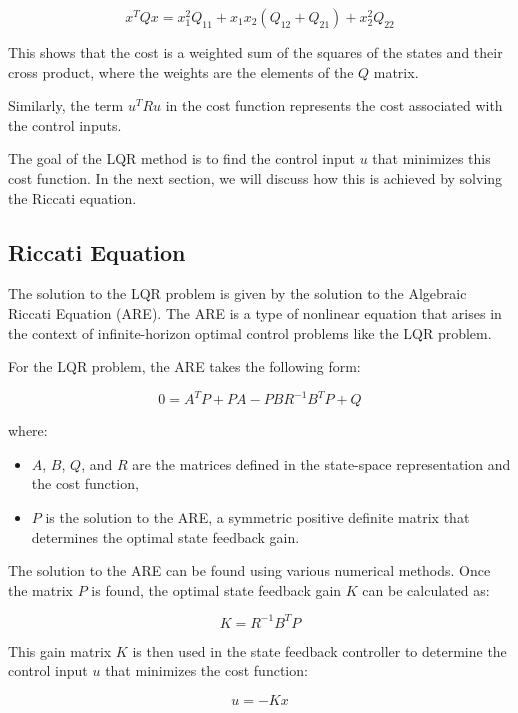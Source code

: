 \documentclass[11pt,twocolumn,twoside,lineno]{pnas-new}
\begin{document}
\begin{equation}
x^TQx = x_1^2Q_{11} + x_1x_2(Q_{12} + Q_{21}) + x_2^2Q_{22}
\end{equation}

This shows that the cost is a weighted sum of the squares of the states and their cross product, where the weights are the elements of the \(Q\) matrix.

Similarly, the term \(u^TRu\) in the cost function represents the cost associated with the control inputs.

The goal of the LQR method is to find the control input \(u\) that minimizes this cost function. In the next section, we will discuss how this is achieved by solving the Riccati equation.


\subsection{Riccati Equation}
The solution to the LQR problem is given by the solution to the Algebraic Riccati Equation (ARE). The ARE is a type of nonlinear equation that arises in the context of infinite-horizon optimal control problems like the LQR problem.

For the LQR problem, the ARE takes the following form:

\begin{equation}
0 = A^TP + PA - PBR^{-1}B^TP + Q
\end{equation}

where:
\begin{itemize}
    \item \(A\), \(B\), \(Q\), and \(R\) are the matrices defined in the state-space representation and the cost function,
    \item \(P\) is the solution to the ARE, a symmetric positive definite matrix that determines the optimal state feedback gain.
\end{itemize}

The solution to the ARE can be found using various numerical methods. Once the matrix \(P\) is found, the optimal state feedback gain \(K\) can be calculated as:

\begin{equation}
K = R^{-1}B^TP
\end{equation}

This gain matrix \(K\) is then used in the state feedback controller to determine the control input \(u\) that minimizes the cost function:

\begin{equation}
u = -Kx
\end{equation}
\end{document}

